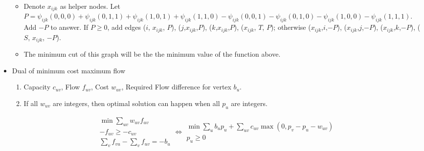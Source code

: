 \begin{itemize}
\begin{itemize}
        \item Denote $x_{ijk}$ as helper nodes. Let $P=\psi_{ijk}(0,0,0)+\psi_{ijk}(0,1,1)+\psi_{ijk}(1,0,1)+\psi_{ijk}(1,1,0)-\psi_{ijk}(0,0,1)-\psi_{ijk}(0,1,0)-\psi_{ijk}(1,0,0)-\psi_{ijk}(1,1,1)$. Add $-P$ to answer. If $P \geq 0$, add edges ($i$, $x_{ijk}$, $P$), ($j$,$x_{ijk}$,$P$), ($k$,$x_{ijk}$,$P$), ($x_{ijk}$, $T$, $P$); otherwise ($x_{ijk}$,$i$,$-P$), ($x_{ijk}$,$j$,$-P$), ($x_{ijk}$,$k$,$-P$), ($S$, $x_{ijk}$, $-P$).
        \item The minimum cut of this graph will be the the minimum value of the function above.
      \end{itemize}
    \item Dual of minimum cost maximum flow
      \begin{enumerate}
        \item Capacity $c_{uv}$, Flow $f_{uv}$, Cost $w_{uv}$, Required Flow difference for vertex $b_u$.
        \item If all $w_{uv}$ are integers, then optimal solution can happen when all $p_u$ are integers.
      \end{enumerate}
      $$
      \begin{aligned}\min\sum_{uv} w_{uv}f_{uv} \\ -f_{uv} \geq -c_{uv} \\ \sum_{v} f_{vu} - \sum_{v} f_{uv} = -b_u\end{aligned}
      \Leftrightarrow
      \begin{aligned}\min\sum_{u} b_up_u + \sum_{uv}c_{uv}\max(0, p_v - p_u - w_{uv}) \\ p_u \geq 0 \end{aligned}
      $$
\end{itemize}

